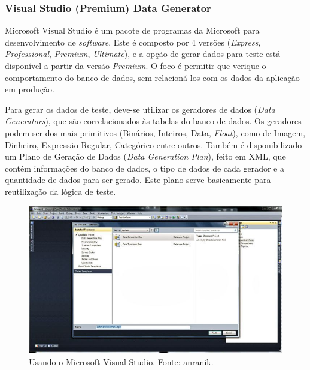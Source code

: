 \documentclass[
	12pt,				%
	openright,			%
	twoside,			%
	a4paper,			%
	english,			%
	brazil				%
	]{abntex2}
\begin{document}
	\subsubsection{Visual Studio (Premium) Data Generator}
	Microsoft Visual Studio \cite{VSDataGenerator} é um pacote de programas da Microsoft para desenvolvimento de \emph{software}. 
	Este é composto por 4 versões (\emph{Express}, \emph{Professional}, \emph{Premium}, \emph{Ultimate}), e a opção de gerar dados para teste está disponível a partir da versão \emph{Premium}.
	O foco é permitir que verique o comportamento do banco de dados, sem relacioná-los com os dados da aplicação em produção.
	\par
	Para gerar os dados de teste, deve-se utilizar os geradores de dados (\emph{Data Generators}), que são correlacionados às tabelas do banco de dados.
		Os geradores podem ser dos mais primitivos (Binários, Inteiros, Data, \emph{Float}), como de Imagem, Dinheiro, Expressão Regular, Categórico entre outros.
	Também é disponibilizado um Plano de Geração de Dados (\emph{Data Generation Plan}), feito em XML, que contém informações do banco de dados, o tipo de dados de cada gerador e a quantidade de dados para ser gerado. 
	Este plano serve basicamente para reutilização da lógica de teste.
	\begin{figure}[h]
		\centering
		\includegraphics[width=\linewidth]{./figures/TrabalhosRelacionados/Visual-Studio.jpg}
		\caption{Usando o Microsoft Visual Studio. Fonte: anranik.}
		\label{fig:VSDG}
	\end{figure}
\end{document}

